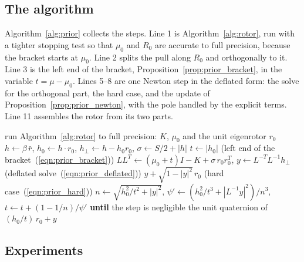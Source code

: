 \documentclass{birkjour}
\theoremstyle{definition}
\theoremstyle{remark}
\numberwithin{equation}{section}
\begin{document}
\subsection{The algorithm}

Algorithm~\ref{alg:prior} collects the steps. Line 1 is Algorithm~\ref{alg:rotor}, run with a tighter stopping test so that $\mu_0$ and $R_0$ are accurate to full precision, because the bracket starts at $\mu_0$. Line 2 splits the pull along $R_0$ and orthogonally to it. Line 3 is the left end of the bracket, Proposition~\ref{prop:prior_bracket}, in the variable $t = \mu - \mu_0$. Lines 5--8 are one Newton step in the deflated form: the solve for the orthogonal part, the hard case, and the update of Proposition~\ref{prop:prior_newton}, with the pole handled by the explicit terms. Line 11 assembles the rotor from its two parts.

\begin{algorithm}[t]
\begin{algorithmic}[1]
\STATE run Algorithm~\ref{alg:rotor} to full precision: $K$, $\mu_0$ and the unit eigenrotor $r_0$
\STATE $h \leftarrow \beta\, \bar r$, \quad $h_0 \leftarrow h \cdot r_0$, \quad $h_\perp \leftarrow h - h_0 r_0$, \quad $\sigma \leftarrow S/2 + |h|$
\STATE $t \leftarrow |h_0|$ \hfill (left end of the bracket~(\ref{eqn:prior_bracket}))
\LOOP
\STATE $L L^T \leftarrow (\mu_0 + t) I - K + \sigma\, r_0 r_0^T$, \quad $y \leftarrow L^{-T} L^{-1} h_\perp$ \hfill (deflated solve~(\ref{eqn:prior_deflated}))
\RETURN $y + \sqrt{1 - |y|^2}\, r_0$ \hfill (hard case~(\ref{eqn:prior_hard}))
\ENDIF
\STATE $n \leftarrow \sqrt{h_0^2 / t^2 + |y|^2}$, \quad $\psi' \leftarrow (h_0^2 / t^3 + |L^{-1} y|^2) / n^3$, \quad $t \leftarrow t + (1 - 1/n) / \psi'$
\STATE \textbf{until} the step is negligible
\ENDLOOP
\RETURN the unit quaternion of $(h_0 / t)\, r_0 + y$
\end{algorithmic}
\caption{Rotor estimation with a prior rotor: the unit quaternion $r$ maximizing $r^T K r + 2 \beta\, \bar r \cdot r$.}
\label{alg:prior}
\end{algorithm}

\subsection{Experiments}
\end{document}
